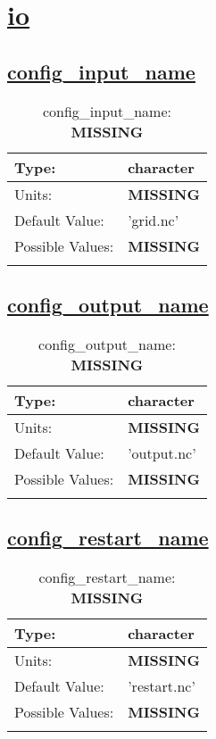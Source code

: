 \section[io]{\hyperref[sec:nm_tab_io]{io}}
\label{sec:nm_sec_io}
\subsection[config\_input\_name]{\hyperref[sec:nm_tab_io]{config\_input\_name}}
\label{subsec:nm_sec_config_input_name}
\begin{center}
\begin{longtable}{| p{2.0in} | p{4.0in} |}
    \hline
    Type: & character \\
    \hline
    Units: & {\bf \color{red} MISSING} \\
    \hline
    Default Value: & 'grid.nc' \\
    \hline
    Possible Values: & {\bf \color{red} MISSING} \\
    \hline
    \caption{config\_input\_name: {\bf \color{red} MISSING}}
\end{longtable}
\end{center}
\subsection[config\_output\_name]{\hyperref[sec:nm_tab_io]{config\_output\_name}}
\label{subsec:nm_sec_config_output_name}
\begin{center}
\begin{longtable}{| p{2.0in} | p{4.0in} |}
    \hline
    Type: & character \\
    \hline
    Units: & {\bf \color{red} MISSING} \\
    \hline
    Default Value: & 'output.nc' \\
    \hline
    Possible Values: & {\bf \color{red} MISSING} \\
    \hline
    \caption{config\_output\_name: {\bf \color{red} MISSING}}
\end{longtable}
\end{center}
\subsection[config\_restart\_name]{\hyperref[sec:nm_tab_io]{config\_restart\_name}}
\label{subsec:nm_sec_config_restart_name}
\begin{center}
\begin{longtable}{| p{2.0in} | p{4.0in} |}
    \hline
    Type: & character \\
    \hline
    Units: & {\bf \color{red} MISSING} \\
    \hline
    Default Value: & 'restart.nc' \\
    \hline
    Possible Values: & {\bf \color{red} MISSING} \\
    \hline
    \caption{config\_restart\_name: {\bf \color{red} MISSING}}
\end{longtable}
\end{center}
